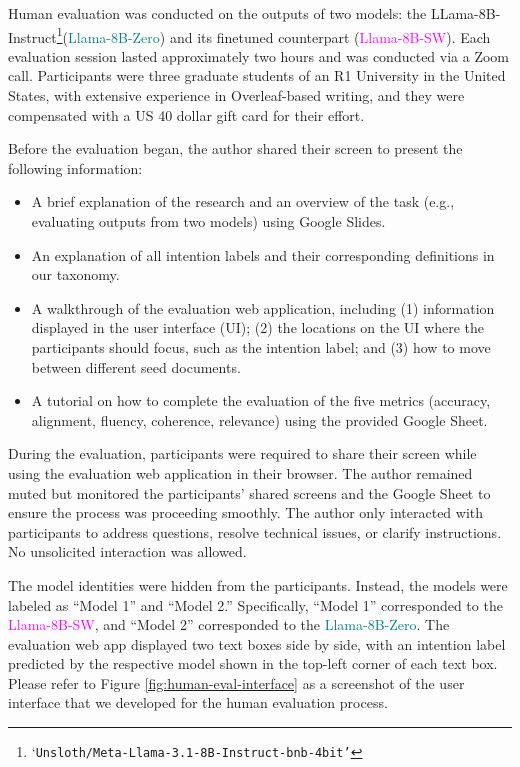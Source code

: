 Human evaluation was conducted on the outputs of two models: the LLama-8B-Instruct\footnote{`\texttt{Unsloth/Meta-Llama-3.1-8B-Instruct-bnb-4bit'}}(\textcolor{teal}{Llama-8B-Zero}) and its finetuned counterpart (\textcolor{magenta}{Llama-8B-SW}). Each evaluation session lasted approximately two hours and was conducted via a Zoom call. Participants were three graduate students of an R1 University in the United States, with extensive experience in Overleaf-based writing, and they were compensated with a US 40 dollar gift card for their effort.

Before the evaluation began, the author shared their screen to present the following information:

\begin{itemize}
    \item A brief explanation of the research and an overview of the task (e.g., evaluating outputs from two models) using Google Slides.
    \item An explanation of all intention labels and their corresponding definitions in our taxonomy.
    \item A walkthrough of the evaluation web application, including (1) information displayed in the user interface (UI); (2) the locations on the UI where the participants should focus, such as the intention label; and (3) how to move between different seed documents.
    \item A tutorial on how to complete the evaluation of the five metrics (accuracy, alignment, fluency, coherence, relevance) using the provided Google Sheet.
\end{itemize}

During the evaluation, participants were required to share their screen while using the evaluation web application in their browser. The author remained muted but monitored the participants' shared screens and the Google Sheet to ensure the process was proceeding smoothly. The author only interacted with participants to address questions, resolve technical issues, or clarify instructions. No unsolicited interaction was allowed.

The model identities were hidden from the participants. Instead, the models were labeled as ``Model 1'' and ``Model 2.'' Specifically, ``Model 1'' corresponded to the \textcolor{magenta}{Llama-8B-SW}, and ``Model 2'' corresponded to the \textcolor{teal}{Llama-8B-Zero}.
The evaluation web app displayed two text boxes side by side, with an intention label predicted by the respective model shown in the top-left corner of each text box. Please refer to Figure \ref{fig:human-eval-interface} as a screenshot of the user interface that we developed for the human evaluation process. 

